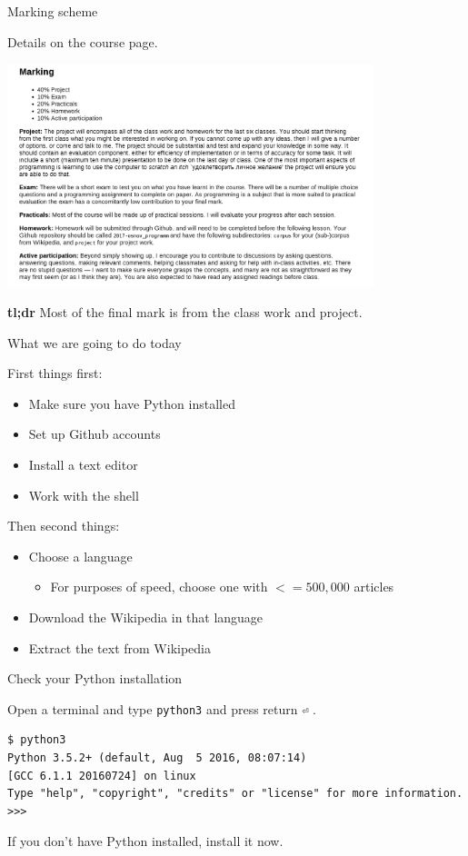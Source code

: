 \documentclass[10pt, compress]{beamer}
\begin{document}
\begin{frame}{Marking scheme}

Details on the course page.

\begin{center}
 \includegraphics[width=0.8\textwidth]{graphics/course-page-marking.png}
\end{center}

\textbf{tl;dr} Most of the final mark is from the class work and project.

\end{frame}


\begin{frame}{What we are going to do today}

First things first:
\begin{itemize}
  \item Make sure you have Python installed
  \item Set up Github accounts
  \item Install a text editor
  \item Work with the shell
\end{itemize}

Then second things:
\begin{itemize}
  \item Choose a language 
  \begin{itemize}
    \item For purposes of speed, choose one with $<= 500,000$ articles
  \end{itemize}
  \item Download the Wikipedia in that language 
  \item Extract the text from Wikipedia
\end{itemize}

\end{frame}

\begin{frame}[fragile]{Check your Python installation}

Open a terminal and type {\tt python3} and press return {\tt ⏎} .

\begin{verbatim}
$ python3
Python 3.5.2+ (default, Aug  5 2016, 08:07:14) 
[GCC 6.1.1 20160724] on linux
Type "help", "copyright", "credits" or "license" for more information.
>>> 
\end{verbatim}

If you don't have Python installed, install it now.

\end{frame}
\end{document}
